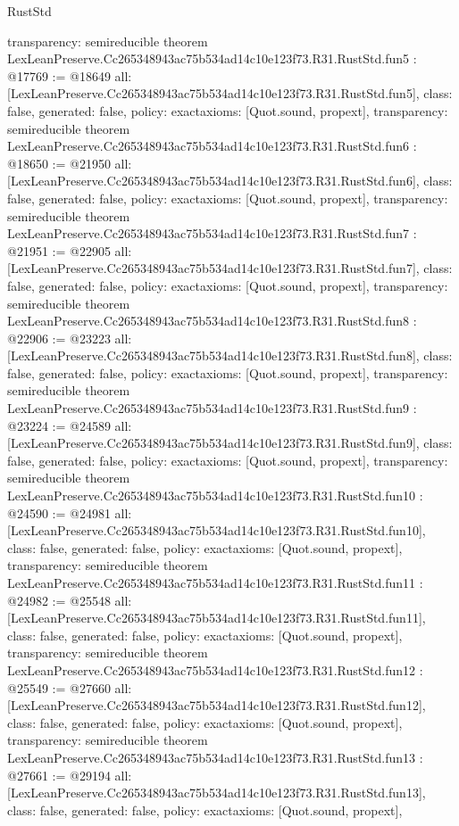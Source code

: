 \begin{lexlean}{RustStd}
\begin{coremodule}
{  transparency: semireducible
}
theorem LexLeanPreserve.Cc265348943ac75b534ad14c10e123f73.R31.RustStd.fun5 : @17769 := @18649 {
  all: [LexLeanPreserve.Cc265348943ac75b534ad14c10e123f73.R31.RustStd.fun5],
  class: false,
  generated: false,
  policy: exact{axioms: [Quot.sound, propext]},
  transparency: semireducible
}
theorem LexLeanPreserve.Cc265348943ac75b534ad14c10e123f73.R31.RustStd.fun6 : @18650 := @21950 {
  all: [LexLeanPreserve.Cc265348943ac75b534ad14c10e123f73.R31.RustStd.fun6],
  class: false,
  generated: false,
  policy: exact{axioms: [Quot.sound, propext]},
  transparency: semireducible
}
theorem LexLeanPreserve.Cc265348943ac75b534ad14c10e123f73.R31.RustStd.fun7 : @21951 := @22905 {
  all: [LexLeanPreserve.Cc265348943ac75b534ad14c10e123f73.R31.RustStd.fun7],
  class: false,
  generated: false,
  policy: exact{axioms: [Quot.sound, propext]},
  transparency: semireducible
}
theorem LexLeanPreserve.Cc265348943ac75b534ad14c10e123f73.R31.RustStd.fun8 : @22906 := @23223 {
  all: [LexLeanPreserve.Cc265348943ac75b534ad14c10e123f73.R31.RustStd.fun8],
  class: false,
  generated: false,
  policy: exact{axioms: [Quot.sound, propext]},
  transparency: semireducible
}
theorem LexLeanPreserve.Cc265348943ac75b534ad14c10e123f73.R31.RustStd.fun9 : @23224 := @24589 {
  all: [LexLeanPreserve.Cc265348943ac75b534ad14c10e123f73.R31.RustStd.fun9],
  class: false,
  generated: false,
  policy: exact{axioms: [Quot.sound, propext]},
  transparency: semireducible
}
theorem LexLeanPreserve.Cc265348943ac75b534ad14c10e123f73.R31.RustStd.fun10 : @24590 := @24981 {
  all: [LexLeanPreserve.Cc265348943ac75b534ad14c10e123f73.R31.RustStd.fun10],
  class: false,
  generated: false,
  policy: exact{axioms: [Quot.sound, propext]},
  transparency: semireducible
}
theorem LexLeanPreserve.Cc265348943ac75b534ad14c10e123f73.R31.RustStd.fun11 : @24982 := @25548 {
  all: [LexLeanPreserve.Cc265348943ac75b534ad14c10e123f73.R31.RustStd.fun11],
  class: false,
  generated: false,
  policy: exact{axioms: [Quot.sound, propext]},
  transparency: semireducible
}
theorem LexLeanPreserve.Cc265348943ac75b534ad14c10e123f73.R31.RustStd.fun12 : @25549 := @27660 {
  all: [LexLeanPreserve.Cc265348943ac75b534ad14c10e123f73.R31.RustStd.fun12],
  class: false,
  generated: false,
  policy: exact{axioms: [Quot.sound, propext]},
  transparency: semireducible
}
theorem LexLeanPreserve.Cc265348943ac75b534ad14c10e123f73.R31.RustStd.fun13 : @27661 := @29194 {
  all: [LexLeanPreserve.Cc265348943ac75b534ad14c10e123f73.R31.RustStd.fun13],
  class: false,
  generated: false,
  policy: exact{axioms: [Quot.sound, propext]},
}
\end{coremodule}
\end{lexlean}
